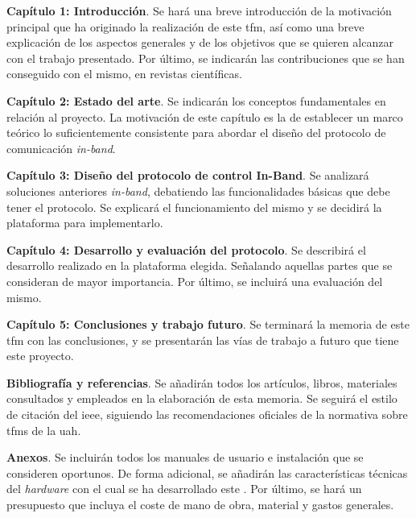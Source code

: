 \begin{description}
    \item\textbf{Capítulo 1: Introducción}. Se hará una breve introducción de la motivación principal que ha originado la realización de este \gls{tfm}, así como una breve explicación de los aspectos generales y de los objetivos que se quieren alcanzar con el trabajo presentado. Por último, se indicarán las contribuciones que se han conseguido con el mismo, en revistas científicas.

    \item\textbf{Capítulo 2: Estado del arte}. Se indicarán los conceptos fundamentales en relación al proyecto. La motivación de este capítulo es la de establecer un marco teórico lo suficientemente consistente para abordar el diseño del protocolo de comunicación \textit{in-band}.

    \item\textbf{Capítulo 3: Diseño del protocolo de control In-Band}. Se analizará soluciones anteriores \textit{in-band}, debatiendo las funcionalidades básicas que debe tener el protocolo. Se explicará el funcionamiento del mismo y se decidirá la plataforma para implementarlo.

    \item\textbf{Capítulo 4: Desarrollo y evaluación del protocolo}. Se describirá el desarrollo realizado en la plataforma elegida. Señalando aquellas partes que se consideran de mayor importancia. Por último, se incluirá una evaluación del mismo.

    \item\textbf{Capítulo 5: Conclusiones y trabajo futuro}. Se terminará la memoria de este \gls{tfm} con las conclusiones, y se presentarán las vías de trabajo a futuro que tiene este proyecto.

    \item[]\textbf{Bibliografía y referencias}. Se añadirán todos los artículos, libros, materiales consultados y empleados en la elaboración de esta memoria. Se seguirá el estilo de citación del \gls{ieee}, siguiendo las recomendaciones oficiales de la normativa sobre \gls{tfm}s de la \gls{uah}.

    \item[]\textbf{Anexos}. Se incluirán todos los manuales de usuario e instalación que se consideren oportunos. De forma adicional, se añadirán las características técnicas del \textit{hardware} con el cual se ha desarrollado este . Por último, se hará un presupuesto que incluya el coste de mano de obra, material y gastos generales.

\end{description}

